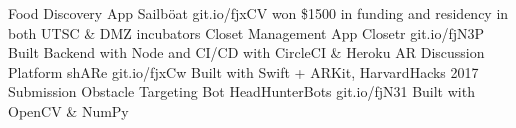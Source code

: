 \begin{cvhonors}
  \cvhonor
    {Food Discovery App}
    {Sailböat}
    {}
    {git.io/fjxCV}
    {won \$1500 in funding and residency in both UTSC \& DMZ incubators}
  \cvhonor
    {Closet Management App}
    {Closetr}
    {}
    {git.io/fjN3P}
    {Built Backend with Node and CI/CD with CircleCI \& Heroku}
  \cvhonor
    {AR Discussion Platform}
    {shARe}
    {}
    {git.io/fjxCw}
    {Built with Swift + ARKit, HarvardHacks 2017 Submission}
  \cvhonor
    {Obstacle Targeting Bot}
    {HeadHunterBots}
    {}
    {git.io/fjN31}
    {Built with OpenCV \& NumPy}
\end{cvhonors}
